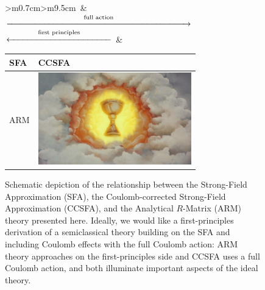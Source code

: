 \begin{figure}[htb]
\centering
\begin{tabular}{>{\centering\arraybackslash}m{0.7cm}>{\centering\arraybackslash}m{9.5cm}}
$\,$&
\Large
\hspace{-7.5mm}
$\displaystyle\stackrel{\text{full action}}{\xrightarrow{\hspace*{7.5cm}}}$
\vspace{0mm}
\\ 
\Large
{}%
{
\hspace{-5mm}
$\displaystyle\stackrel{\text{first principles}}{\xleftarrow{\hspace*{4.2cm}}}$
\hspace{0.5mm}
}
\hspace{-50mm}
& 
\hspace{-7.5mm}
\begin{tabular}{|>{\centering\arraybackslash}m{1cm}|>{\centering\arraybackslash}m{7.3cm}|}
\hline
\vspace{2.5mm}  SFA   \vspace{1.5mm}  & 
\vspace{2.5mm} CCSFA \vspace{1.5mm}  \\ \hline
ARM & 
\vspace{4mm}  \includegraphics[height=4cm]{5-Quantum-orbits/Figures/figure5A.png}  \hspace{-1mm}\vspace{3mm}
\\ \hline
\end{tabular}
\end{tabular}
\vspace{4mm}

\caption[Schematic relationship between the SFA, CCSFA and ARM theories]{
Schematic depiction of the relationship between the Strong-Field Approximation (SFA), the Coulomb-corrected Strong-Field Approximation (CCSFA), and the Analytical $R$-Matrix (ARM) theory presented here. Ideally, we would like a first-principles derivation of a semiclassical theory building on the SFA and including Coulomb effects with the full Coulomb action: ARM theory approaches on the first-principles side and CCSFA uses a full Coulomb action, and both illuminate important aspects of the ideal theory.
}
\label{f5-holy-grail-table}
\end{figure}




